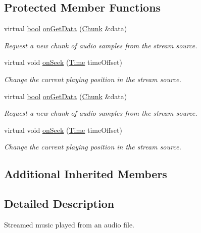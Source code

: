 \subsection*{Protected Member Functions}
\begin{DoxyCompactItemize}
\item 
virtual \hyperlink{term__entry_8h_a002004ba5d663f149f6c38064926abac}{bool} \hyperlink{classsf_1_1_music_aca1bcb4e5d56a854133e74bd86374463}{on\-Get\-Data} (\hyperlink{structsf_1_1_sound_stream_1_1_chunk}{Chunk} \&data)
\begin{DoxyCompactList}\small\item\em Request a new chunk of audio samples from the stream source. \end{DoxyCompactList}\item 
virtual void \hyperlink{classsf_1_1_music_a15119cc0419c16bb334fa0698699c02e}{on\-Seek} (\hyperlink{classsf_1_1_time}{Time} time\-Offset)
\begin{DoxyCompactList}\small\item\em Change the current playing position in the stream source. \end{DoxyCompactList}\item 
virtual \hyperlink{term__entry_8h_a002004ba5d663f149f6c38064926abac}{bool} \hyperlink{classsf_1_1_music_aca1bcb4e5d56a854133e74bd86374463}{on\-Get\-Data} (\hyperlink{structsf_1_1_sound_stream_1_1_chunk}{Chunk} \&data)
\begin{DoxyCompactList}\small\item\em Request a new chunk of audio samples from the stream source. \end{DoxyCompactList}\item 
virtual void \hyperlink{classsf_1_1_music_a15119cc0419c16bb334fa0698699c02e}{on\-Seek} (\hyperlink{classsf_1_1_time}{Time} time\-Offset)
\begin{DoxyCompactList}\small\item\em Change the current playing position in the stream source. \end{DoxyCompactList}\end{DoxyCompactItemize}
\subsection*{Additional Inherited Members}


\subsection{Detailed Description}
Streamed music played from an audio file. 

